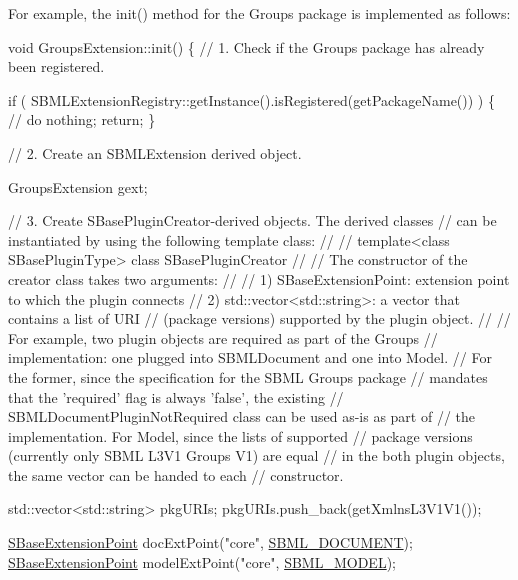 For example, the {\ttfamily init()} method for the Groups package is implemented as follows\+: 
\begin{DoxyCode}
\textcolor{keywordtype}{void} GroupsExtension::init()
\{
  \textcolor{comment}{// 1. Check if the Groups package has already been registered.}

  \textcolor{keywordflow}{if} ( SBMLExtensionRegistry::getInstance().isRegistered(getPackageName()) )
  \{
    \textcolor{comment}{// do nothing;}
    \textcolor{keywordflow}{return};
  \}

  \textcolor{comment}{// 2. Create an SBMLExtension derived object.}

  GroupsExtension gext;

  \textcolor{comment}{// 3. Create SBasePluginCreator-derived objects. The derived classes}
  \textcolor{comment}{// can be instantiated by using the following template class:}
  \textcolor{comment}{//}
  \textcolor{comment}{//   template<class SBasePluginType> class SBasePluginCreator}
  \textcolor{comment}{//}
  \textcolor{comment}{// The constructor of the creator class takes two arguments:}
  \textcolor{comment}{//}
  \textcolor{comment}{// 1) SBaseExtensionPoint: extension point to which the plugin connects}
  \textcolor{comment}{// 2) std::vector<std::string>: a vector that contains a list of URI}
  \textcolor{comment}{// (package versions) supported by the plugin object.}
  \textcolor{comment}{//}
  \textcolor{comment}{// For example, two plugin objects are required as part of the Groups}
  \textcolor{comment}{// implementation: one plugged into SBMLDocument and one into Model.}
  \textcolor{comment}{// For the former, since the specification for the SBML Groups package}
  \textcolor{comment}{// mandates that the 'required' flag is always 'false', the existing}
  \textcolor{comment}{// SBMLDocumentPluginNotRequired class can be used as-is as part of}
  \textcolor{comment}{// the implementation.  For Model, since the lists of supported}
  \textcolor{comment}{// package versions (currently only SBML L3V1 Groups V1) are equal}
  \textcolor{comment}{// in the both plugin objects, the same vector can be handed to each}
  \textcolor{comment}{// constructor.}

  std::vector<std::string> pkgURIs;
  pkgURIs.push\_back(getXmlnsL3V1V1());

  \hyperlink{class_s_base_extension_point}{SBaseExtensionPoint} docExtPoint(\textcolor{stringliteral}{"core"}, \hyperlink{_s_b_m_l_type_codes_8h_aa283dddfd7671179362b2f38e2938cfeabfe976c674a5a708c1373dfdfa3bfa63}{SBML\_DOCUMENT});
  \hyperlink{class_s_base_extension_point}{SBaseExtensionPoint} modelExtPoint(\textcolor{stringliteral}{"core"}, \hyperlink{_s_b_m_l_type_codes_8h_aa283dddfd7671179362b2f38e2938cfea3c866be107d7858b6dd1e978ed103028}{SBML\_MODEL});


\end{DoxyCode}
